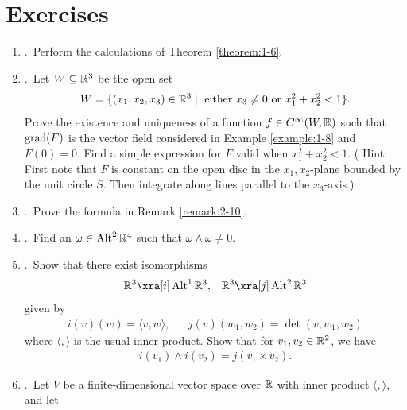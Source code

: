 \chapter{Exercises}
\setcounter{exercise}{1}
\newcommand{\newchap}[1][1]{\setcounter{exercise}{#1}\setcounter{enumi}{0}}
\let\oriITEM\item
\newcommand{\NewItem}{%
  \oriITEM{\hspace*{-5.5pt}.\;\,}\label{exercise:\theexercise-\arabic{enumi}}%
}

\begin{enumerate}[\theexercise.1]
  \NewItem Perform the calculations of Theorem \ref{theorem:1-6}.
  \NewItem Let $W\subseteq{\ensuremath{\mathbb{R}}}^3$ be the open set
    \begin{align*}
      W = \{(x_1, x_2, x_3)\in{\ensuremath{\mathbb{R}}}^3\mid \text{ either } x_3\neq 0 \text{ or } x_1^2 + x_2^2<1\}.
    \end{align*}
    Prove the existence and uniqueness of a function $f\in C^\infty(W, {\mathbb{R}})$ such that
    $\operatorname{grad}(F)$ is the vector field considered in Example \ref{example:1-8} and $F(0)= 0$.
    Find a simple expression for $F$ valid when $x_1^2 + x_2^2 < 1$. ( Hint: First note that $F$ is
    constant on the open disc in the $x_1, x_2$-plane bounded by the unit circle $S$. Then integrate
    along lines parallel to the $x_3$-axis.) 
  \newchap[2]
  \NewItem Prove the formula in Remark \ref{remark:2-10}.
  \NewItem Find an $\omega\in\operatorname{Alt}^2{\mathbb{R}}^4$ such that $\omega\wedge\omega\neq 0$.
  \NewItem Show that there exist isomorphisms
    \begin{align*}
      \RR^3 \xra[i] \alt^1\RR^3, &  & \RR^3 \xra[j]\alt^2\RR^3
    \end{align*}
    given by
    \begin{align*}
      i(v)(w) = \langle v, w \rangle, &  & j(v)(w_1, w_2) = \det(v, w_1, w_2)
    \end{align*}
    where $\langle, \rangle$ is the usual inner product. Show that for $v_1, v_2\in{\ensuremath{\mathbb{R}}}^2$, we have
    \begin{align*}
      i(v_1)\wedge i(v_2) = j(v_1\times v_2).
    \end{align*}
  \NewItem Let $V$ be a finite-dimensional vector space over $\mathbb{R}$ with inner product $\langle, \rangle$, and let

\end{enumerate}
